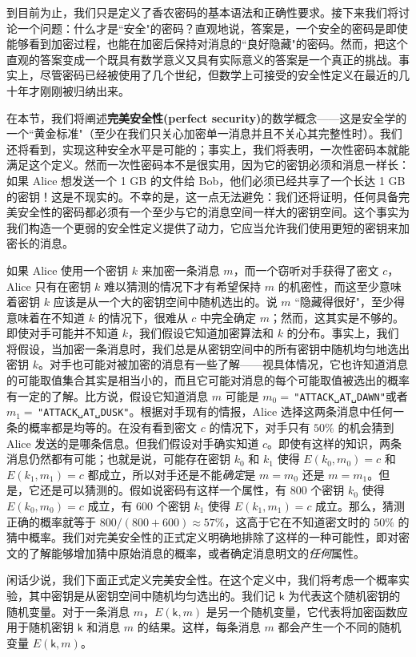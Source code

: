到目前为止，我们只是定义了香农密码的基本语法和正确性要求。接下来我们将讨论一个问题：什么才是``安全"的密码？直观地说，答案是，一个安全的密码是即使能够看到加密过程，也能在加密后保持对消息的``良好隐藏"的密码。然而，把这个直观的答案变成一个既具有数学意义又具有实际意义的答案是一个真正的挑战。事实上，尽管密码已经被使用了几个世纪，但数学上可接受的安全性定义在最近的几十年才刚刚被归纳出来。

在本节，我们将阐述\textbf{完美安全性(perfect security)}的数学概念——这是安全学的一个``黄金标准"（至少在我们只关心加密单一消息并且不关心其完整性时）。我们还将看到，实现这种安全水平是可能的；事实上，我们将表明，一次性密码本就能满足这个定义。然而一次性密码本不是很实用，因为它的密钥必须和消息一样长：如果 Alice 想发送一个 1 GB 的文件给 Bob，他们必须已经共享了一个长达 1 GB 的密钥！这是不现实的。不幸的是，这一点无法避免：我们还将证明，任何具备完美安全性的密码都必须有一个至少与它的消息空间一样大的密钥空间。这个事实为我们构造一个更弱的安全性定义提供了动力，它应当允许我们使用更短的密钥来加密长的消息。

如果 Alice 使用一个密钥 $k$ 来加密一条消息 $m$，而一个窃听对手获得了密文 $c$，Alice 只有在密钥 $k$ 难以猜测的情况下才有希望保持 $m$ 的机密性，而这至少意味着密钥 $k$ 应该是从一个大的密钥空间中随机选出的。说 $m$ ``隐藏得很好"，至少得意味着在不知道 $k$ 的情况下，很难从 $c$ 中完全确定 $m$；然而，这其实是不够的。即使对手可能并不知道 $k$，我们假设它知道加密算法和 $k$ 的分布。事实上，我们将假设，当加密一条消息时，我们总是从密钥空间中的所有密钥中随机均匀地选出密钥 $k$。对手也可能对被加密的消息有一些了解——视具体情况，它也许知道消息的可能取值集合其实是相当小的，而且它可能对消息的每个可能取值被选出的概率有一定的了解。比方说，假设它知道消息 $m$ 可能是 $m_0=\,$\texttt{"ATTACK␣AT␣DAWN"}或者 $m_1=\,$\texttt{"ATTACK␣AT␣DUSK"}。根据对手现有的情报，Alice 选择这两条消息中任何一条的概率都是均等的。在没有看到密文 $c$ 的情况下，对手只有 $50\%$ 的机会猜到 Alice 发送的是哪条信息。但我们假设对手确实知道 $c$。即使有这样的知识，两条消息仍然都有可能；也就是说，可能存在密钥 $k_0$ 和 $k_1$ 使得 $E(k_0,m_0)=c$ 和 $E(k_1,m_1)=c$ 都成立，所以对手还是不能\emph{确定}是 $m=m_0$ 还是 $m=m_1$。但是，它还是可以猜测的。假如说密码有这样一个属性，有 $800$ 个密钥 $k_0$ 使得 $E(k_0,m_0)=c$ 成立，有 $600$ 个密钥 $k_1$ 使得 $E(k_1,m_1)=c$ 成立。那么，猜测正确的概率就等于 $800/(800+600)\approx57\%$，这高于它在不知道密文时的 $50\%$ 的猜中概率。我们对完美安全性的正式定义明确地排除了这样的一种可能性，即对密文的了解能够增加猜中原始消息的概率，或者确定消息明文的\emph{任何}属性。

闲话少说，我们下面正式定义完美安全性。在这个定义中，我们将考虑一个概率实验，其中密钥是从密钥空间中随机均匀选出的。我们记 $\mathsf{k}$ 为代表这个随机密钥的随机变量。对于一条消息 $m$，$E(\mathsf{k},m)$ 是另一个随机变量，它代表将加密函数应用于随机密钥 $\mathsf{k}$ 和消息 $m$ 的结果。这样，每条消息 $m$ 都会产生一个不同的随机变量 $E(\mathsf{k},m)$。

